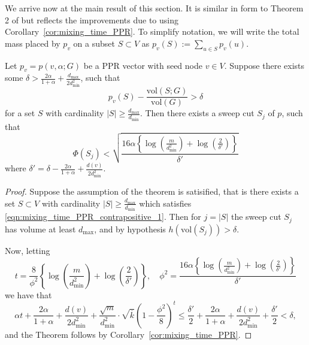 \documentclass[11pt,twoside]{article}
\newcommand{\set}[1]{\left\{#1\right\}}
\newcommand{\vol}{\mathrm{vol}}
\newcommand{\abs}[1]{\left \lvert #1 \right \rvert}
\newcommand{\1}{\mathbbm{1}}
\begin{document}
We arrive now at the main result of this section. It is similar in form to Theorem 2 of \citet{andersen2006} but reflects the improvements due to using Corollary~\ref{cor:mixing_time_PPR}. To simplify notation, we will write the total mass placed by $p_v$ on a subset $S \subset V$ as $p_v(S) := \sum_{u \in S} p_v(u)$.
\begin{theorem}
	\label{thm:mixing_time_PPR_contrapositive}
	Let $p_v = p(v,\alpha;G)$ be a PPR vector with seed node $v \in V$. Suppose there exists some $\delta > \frac{2\alpha}{1 + \alpha} + \frac{d_{\max}}{2d_{\min}^2}$, such that
	\begin{equation}
	\label{eqn:mixing_time_PPR_contrapositive_1}
	p_v(S) - \frac{\vol(S;G)}{\vol(G)} > \delta
	\end{equation}
	for a set $S$ with cardinality $\abs{S} \geq \frac{d_{\max}}{d_{\min}}$. Then there exists a sweep cut $S_j$ of $p$, such that
	\begin{equation*}
	\Phi(S_j) < \sqrt{\frac{16\alpha\left\{\log\left(\frac{m}{d_{\min}^2}\right) + \log\left(\frac{2}{\delta'}\right)\right\}}{\delta'}}
	\end{equation*}
	where $\delta' = \delta - \frac{2\alpha}{1 + \alpha} + \frac{d(v)}{2d_{\min}^2}$. 
\end{theorem}
\begin{proof}
	Suppose the assumption of the theorem is satisified, that is there exists a set $S \subset V$ with cardinality $\abs{S} \geq \frac{d_{\max}}{d_{\min}}$ which satisfies \eqref{eqn:mixing_time_PPR_contrapositive_1}. Then for $j = \abs{S}$ the sweep cut $S_j$ has volume at least $d_{\max}$, and by hypothesis $h(\vol(S_j)) >  \delta$.
	
	Now, letting
	\begin{equation*}
	t = \frac{8}{\phi^2}\left\{\log\left(\frac{m}{d_{\min}^2}\right) + \log\left(\frac{2}{\delta'}\right)\right\}, \quad \phi^2 = \frac{16\alpha\set{\log\left(\frac{m}{d_{\min}^2}\right) + \log(\frac{2}{\delta'})}}{\delta'}
	\end{equation*}
	we have that
	\begin{equation*}
	\alpha t + \frac{2\alpha}{1 + \alpha} + \frac{d(v)}{2d_{\min}^2} + \frac{\sqrt{m}}{d_{\min}^2} \cdot \sqrt{\overline{k}} \left(1 - \frac{\phi^2}{8}\right)^{t} \leq \frac{\delta'}{2} + \frac{2\alpha}{1 + \alpha} + \frac{d(v)}{2d_{\min}^2} + \frac{\delta'}{2} < \delta,
	\end{equation*}
	and the Theorem follows by Corollary~\ref{cor:mixing_time_PPR}.
\end{proof}
\end{document}

